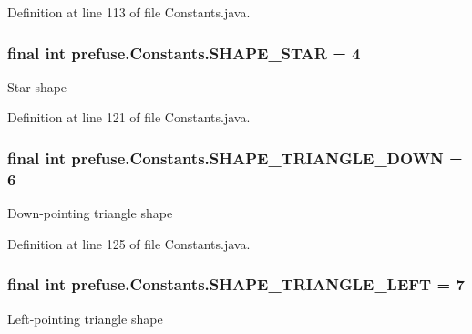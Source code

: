 \-Definition at line 113 of file \-Constants.\-java.

\hypertarget{interfaceprefuse_1_1_constants_a1ac6f54ddd18c2c444b5251c39266acc}{
\subsubsection[{\-S\-H\-A\-P\-E\-\_\-\-S\-T\-A\-R}]{\setlength{\rightskip}{0pt plus 5cm}final int {\bf prefuse.\-Constants.\-S\-H\-A\-P\-E\-\_\-\-S\-T\-A\-R} = 4}}\label{interfaceprefuse_1_1_constants_a1ac6f54ddd18c2c444b5251c39266acc}
\-Star shape 

\-Definition at line 121 of file \-Constants.\-java.

\hypertarget{interfaceprefuse_1_1_constants_a26e1be3622f398da5f9f7edfa845d527}{
\subsubsection[{\-S\-H\-A\-P\-E\-\_\-\-T\-R\-I\-A\-N\-G\-L\-E\-\_\-\-D\-O\-W\-N}]{\setlength{\rightskip}{0pt plus 5cm}final int {\bf prefuse.\-Constants.\-S\-H\-A\-P\-E\-\_\-\-T\-R\-I\-A\-N\-G\-L\-E\-\_\-\-D\-O\-W\-N} = 6}}\label{interfaceprefuse_1_1_constants_a26e1be3622f398da5f9f7edfa845d527}
\-Down-\/pointing triangle shape 

\-Definition at line 125 of file \-Constants.\-java.

\hypertarget{interfaceprefuse_1_1_constants_a9de8d68fa62d8fa46a0892436fc75d21}{
\subsubsection[{\-S\-H\-A\-P\-E\-\_\-\-T\-R\-I\-A\-N\-G\-L\-E\-\_\-\-L\-E\-F\-T}]{\setlength{\rightskip}{0pt plus 5cm}final int {\bf prefuse.\-Constants.\-S\-H\-A\-P\-E\-\_\-\-T\-R\-I\-A\-N\-G\-L\-E\-\_\-\-L\-E\-F\-T} = 7}}\label{interfaceprefuse_1_1_constants_a9de8d68fa62d8fa46a0892436fc75d21}
\-Left-\/pointing triangle shape 

